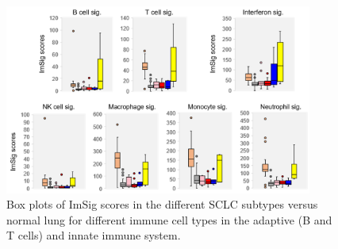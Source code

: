 \begin{figure}[htbp]
    \centering
    \includegraphics[width=0.9\textwidth,keepaspectratio]{images/sclc/imsig_subtype_boxplot}
    \vspace{-0.5cm}
    \caption[ImSig scores by SCLC subtype.]{Box plots of ImSig scores in the different SCLC subtypes versus normal lung for different immune cell types in the adaptive (B and T cells) and innate immune system.}
    \label{fig:sclc:imsig_subtype_boxplot}
\end{figure}
